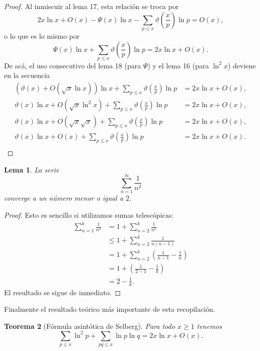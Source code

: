 \documentclass[10pt]{article}
\newtheorem{theorem}{Teorema}
\newtheorem{lemma}[theorem]{Lema}
\theoremstyle{definition}
\theoremstyle{remark}
\begin{document}
\begin{proof}
Al inmiscuir al lema 17, esta relaci\'on se troca por 
$$
2x\ln x + O(x) - \Psi(x)\ln x - \sum_{p \leq x} \vartheta\left(\frac{x}{p}\right)\ln p = O(x), 
$$
o lo que es lo mismo por 
$$
\Psi(x)\ln x + \sum_{p \leq x} \vartheta\left(\frac{x}{p}\right)\ln p = 2x\ln x + O(x).
$$
De ac\'a, el uso consecutivo del lema 18 (para $\Psi$) y el lema 16 (para $\ln^2 x$) deviene en la secuencia
\begin{align*}
(\vartheta(x) + O(\sqrt{x}\ln x))\ln x + \sum_{p \leq x} \vartheta\left(\frac{x}{p}\right)\ln p &= 2x\ln x + O(x), \\
\vartheta(x)\ln x + O(\sqrt{x}\ln^2 x) + \sum_{p \leq x} \vartheta\left(\frac{x}{p}\right)\ln p &= 2x\ln x + O(x), \\
\vartheta(x)\ln x + O(\sqrt{x}\sqrt{x}) + \sum_{p \leq x} \vartheta\left(\frac{x}{p}\right)\ln p &= 2x\ln x + O(x), \\
\vartheta(x)\ln x + O(x) + \sum_{p \leq x} \vartheta\left(\frac{x}{p}\right)\ln p &= 2x\ln x + O(x). \\
\end{align*}
\end{proof}

\begin{lemma}
La serie
\[
\sum_{n = 1}^\infty \frac{1}{n ^ 2}
\]
converge a un n\'umero menor o igual a $2$. 
\end{lemma}

\begin{proof}
Esto es sencillo si utilizamos sumas telesc\'opicas: 
\begin{align}
\sum_{n = 1}^k \frac{1}{n^2} &= 1 + \sum_{n = 2}^k \frac{1}{n^2} \\
&\leq 1 + \sum_{n = 2}^k \frac{1}{n (n - 1)} \\
&= 1 + \sum_{n = 2}^k \left(\frac{1}{n - 1} - \frac{1}{n}\right) \\
&= 1 + \left(\frac{1}{2 - 1} - \frac{1}{k}\right) \\
&= 2 - \frac{1}{k}.
\end{align}
El resultado se sigue de inmediato. 
\end{proof}

Finalmente el resultado te\'orico m\'as importante de esta recopilaci\'on. 

\begin{theorem}[F\'ormula asint\'otica de Selberg]
Para todo $x \geq 1$ tenemos
$$\sum_{p \leq x} \ln^2 p + \sum_{pq \leq x} \ln p \ln q = 2x\ln x + O(x).$$
\end{theorem}
\end{document}
